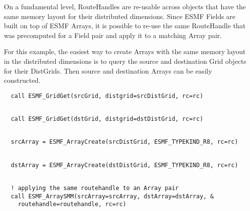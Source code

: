 
   On a fundamental level, RouteHandles are re-usable across objects that
   have the same memory layout for their distributed dimensions. Since ESMF
   Fields are built on top of ESMF Arrays, it is 
   possible to re-use the same RouteHandle that was precomputed for a Field
   pair and apply it to a matching Array pair. 
  
   For this example, the easiest way to create Arrays with the same memory 
   layout in the distributed dimensions is to query the source and destination
   Grid objects for their DistGrids. Then source and destination Arrays can be
   easily constructed. 

 \begin{verbatim}
  call ESMF_GridGet(srcGrid, distgrid=srcDistGrid, rc=rc)
 
\end{verbatim}
 

 \begin{verbatim}
  call ESMF_GridGet(dstGrid, distgrid=dstDistGrid, rc=rc)
 
\end{verbatim}
 

 \begin{verbatim}
  srcArray = ESMF_ArrayCreate(srcDistGrid, ESMF_TYPEKIND_R8, rc=rc)
 
\end{verbatim}
 

 \begin{verbatim}
  dstArray = ESMF_ArrayCreate(dstDistGrid, ESMF_TYPEKIND_R8, rc=rc)
 
\end{verbatim}
 

 \begin{verbatim}
  ! applying the same routehandle to an Array pair
  call ESMF_ArraySMM(srcArray=srcArray, dstArray=dstArray, &
    routehandle=routehandle, rc=rc)
 
\end{verbatim}
 
